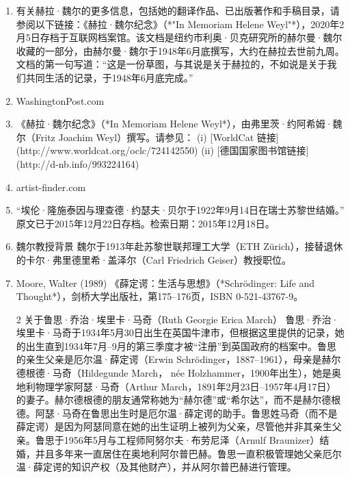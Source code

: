 \begin{enumerate}
\item 有关赫拉·魏尔的更多信息，包括她的翻译作品、已出版著作和手稿目录，请参阅以下链接：《赫拉·魏尔纪念》（*"In Memoriam Helene Weyl"*），2020年2月5日存档于互联网档案馆。该文档是纽约市利奥·贝克研究所的赫尔曼·魏尔收藏的一部分，由赫尔曼·魏尔于1948年6月底撰写，大约在赫拉去世前九周。文档的第一句写道：“这是一份草图，与其说是关于赫拉的，不如说是关于我们共同生活的记录，于1948年6月底完成。”  
\item WashingtonPost.com
\item 《赫拉·魏尔纪念》（*In Memoriam Helene Weyl*），由弗里茨·约阿希姆·魏尔（Fritz Joachim Weyl）撰写。请参见：  
(i) [WorldCat 链接](http://www.worldcat.org/oclc/724142550)  
(ii) [德国国家图书馆链接](http://d-nb.info/993224164)  
\item artist-finder.com
\item “埃伦·隆施泰因与理查德·约瑟夫·贝尔于1922年9月14日在瑞士苏黎世结婚。”  
原文已于2015年12月22日存档。检索日期：2015年12月18日。  
\item 魏尔教授背景 魏尔于1913年赴苏黎世联邦理工大学（ETH Zürich），接替退休的卡尔·弗里德里希·盖泽尔（Carl Friedrich Geiser）教授职位。
\item Moore, Walter (1989) 《薛定谔：生活与思想》（*Schrödinger: Life and Thought*），剑桥大学出版社，第175–176页，ISBN 0-521-43767-9。  
\item [2] 关于鲁思·乔治·埃里卡·马奇（Ruth Georgie Erica March）  
鲁思·乔治·埃里卡·马奇于1934年5月30日出生在英国牛津市，但根据这里提供的记录，她的出生直到1934年7月–9月的第三季度才被“注册”到英国政府的档案中。鲁思的亲生父亲是厄尔温·薛定谔（Erwin Schrödinger，1887–1961），母亲是赫尔德根德·马奇（Hildegunde March， née Holzhammer，1900年出生），她是奥地利物理学家阿瑟·马奇（Arthur March，1891年2月23日–1957年4月17日）的妻子。赫尔德根德的朋友通常称她为“赫尔德”或“希尔达”，而不是赫尔德根德。阿瑟·马奇在鲁思出生时是厄尔温·薛定谔的助手。鲁思姓马奇（而不是薛定谔）是因为阿瑟同意在她的出生证明上被列为父亲，尽管他并非其亲生父亲。鲁思于1956年5月与工程师阿努尔夫·布劳尼泽（Arnulf Braunizer）结婚，并且多年来一直居住在奥地利阿尔普巴赫。鲁思一直积极管理她父亲厄尔温·薛定谔的知识产权（及其他财产），并从阿尔普巴赫进行管理。
\end{enumerate}